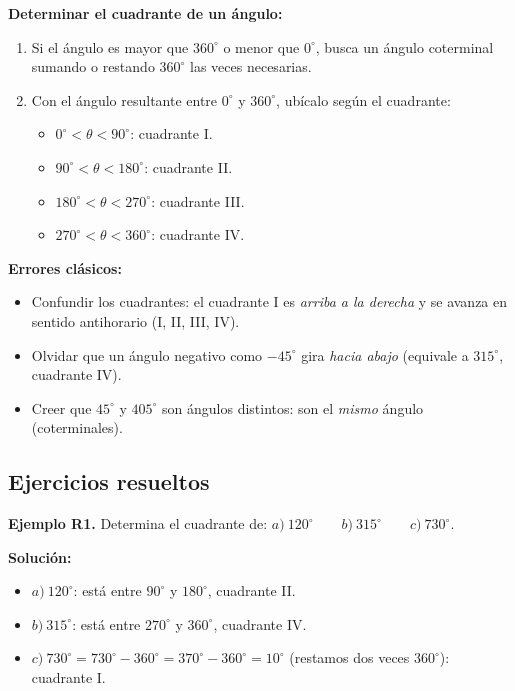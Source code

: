 \documentclass[12pt, letterpaper]{article}
\begin{document}
\begin{cuadropasos}
  \textbf{Determinar el cuadrante de un ángulo:}
  \begin{enumerate}[leftmargin=*]
    \item Si el ángulo es mayor que $360^{\circ}$ o menor que $0^{\circ}$, busca un ángulo coterminal sumando o restando $360^{\circ}$ las veces necesarias.
    \item Con el ángulo resultante entre $0^{\circ}$ y $360^{\circ}$, ubícalo según el cuadrante:
          \begin{itemize}[leftmargin=*]
            \item $0^{\circ} < \theta < 90^{\circ}$: cuadrante I.
            \item $90^{\circ} < \theta < 180^{\circ}$: cuadrante II.
            \item $180^{\circ} < \theta < 270^{\circ}$: cuadrante III.
            \item $270^{\circ} < \theta < 360^{\circ}$: cuadrante IV.
          \end{itemize}
  \end{enumerate}
\end{cuadropasos}
\newpage
\begin{cuadroadvertencia}
  \textbf{Errores clásicos:}
  \begin{itemize}[leftmargin=*]
    \item Confundir los cuadrantes: el cuadrante I es \emph{arriba a la derecha} y se avanza en sentido antihorario (I, II, III, IV).
    \item Olvidar que un ángulo negativo como $-45^{\circ}$ gira \emph{hacia abajo} (equivale a $315^{\circ}$, cuadrante IV).
    \item Creer que $45^{\circ}$ y $405^{\circ}$ son ángulos distintos: son el \emph{mismo} ángulo (coterminales).
  \end{itemize}
\end{cuadroadvertencia}

\subsection{Ejercicios resueltos}

\textbf{Ejemplo R1.} Determina el cuadrante de: $a)\ 120^{\circ} \qquad b)\ 315^{\circ} \qquad c)\ 730^{\circ}$.

\begin{cuadrosolucion}
  \textbf{Solución:}
  \begin{itemize}
    \item $a)\ 120^{\circ}$: está entre $90^{\circ}$ y $180^{\circ}$, cuadrante II.
    \item $b)\ 315^{\circ}$: está entre $270^{\circ}$ y $360^{\circ}$, cuadrante IV.
    \item $c)\ 730^{\circ} = 730^{\circ} - 360^{\circ} = 370^{\circ} - 360^{\circ} = 10^{\circ}$ (restamos dos veces $360^{\circ}$): cuadrante I.
  \end{itemize}
\end{cuadrosolucion}
\end{document}
